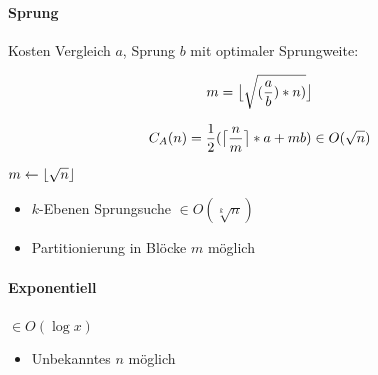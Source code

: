 \paragraph{Sprung}
Kosten Vergleich $a$, Sprung $b$ mit optimaler Sprungweite:

$$m = \floor[\big]{\sqrt{(\frac{a}{b}) * n)}}$$

$$C_A(n) = \frac{1}{2} ( \ceil[\big]{\frac{n}{m}} * a + mb) \in O(\sqrt{n})$$

\begin{algorithm}[H]


  $m \leftarrow \floor{\sqrt{n}}$


\end{algorithm}

\begin{itemize}
  \item $k$-Ebenen Sprungsuche $\in O(\sqrt[k]{n})$

  \item Partitionierung in Blöcke $m$ möglich
\end{itemize}

\paragraph{Exponentiell}
$\in O(\log x)$\

\begin{algorithm}[H]



\end{algorithm}

\begin{itemize}
  \item Unbekanntes $n$ möglich
\end{itemize}

